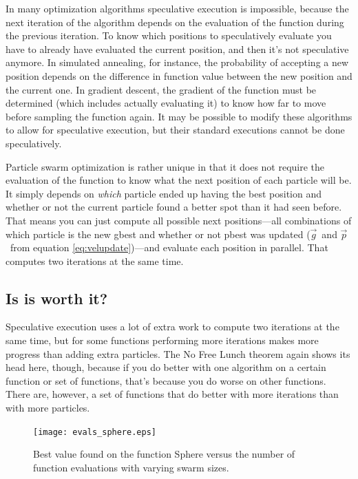 \documentclass[onecolumn, 12pt]{article}
\providecommand{\gbest}{\ensuremath{\Vec{g}}}
\providecommand{\pbest}{\ensuremath{\Vec{p}}}
\begin{document}
In many optimization algorithms speculative execution is impossible, because
the next iteration of the algorithm depends on the evaluation of the function
during the previous iteration.  To know which positions to speculatively
evaluate you have to already have evaluated the current position, and then it's
not speculative anymore.  In simulated annealing, for instance, the probability
of accepting a new position depends on the difference in function value between
the new position and the current one.  In gradient descent, the gradient of the
function must be determined (which includes actually evaluating it) to know how
far to move before sampling the function again.  It may be possible to modify
these algorithms to allow for speculative execution, but their standard
executions cannot be done speculatively.

Particle swarm optimization is rather unique in that it does not require the
evaluation of the function to know what the next position of each particle will
be.  It simply depends on \emph{which} particle ended up having the best
position and whether or not the current particle found a better spot than it
had seen before.  That means you can just compute all possible next
positions---all combinations of which particle is the new gbest and whether or
not pbest was updated (\gbest\ and \pbest\ from equation
\eqref{eq:velupdate})---and evaluate each position in parallel.  That computes
two iterations at the same time.  

\subsection{Is is worth it?}

Speculative execution uses a lot of extra work to compute two iterations at the
same time, but for some functions performing more iterations makes more
progress than adding extra particles.  The No Free Lunch theorem again shows
its head here, though, because if you do better with one algorithm on a certain
function or set of functions, that's because you do worse on other functions.
There are, however, a set of functions that do better with more iterations than
with more particles.

\begin{figure}
  \centering
  \texttt{[image: evals\_sphere.eps]}
  \caption{Best value found on the function Sphere versus the number of 
  function evaluations with varying swarm sizes.}
  \label{fig:sphere}
\end{figure}
\end{document}
